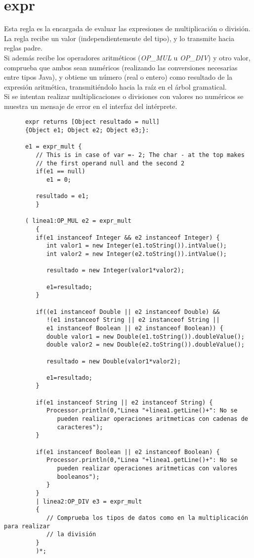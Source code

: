    \section{expr}
   Esta regla es la encargada de evaluar las expresiones de multiplicación o división. La regla recibe un valor 
   (independientemente del tipo), y lo transmite hacia reglas padre. \\
   Si además recibe los operadores aritméticos (\textit{OP\_MUL} u \textit{OP\_DIV}) y otro valor, comprueba que ambos sean 
   numéricos (realizando las conversiones necesarias entre tipos Java), y obtiene un número (real o entero) como resultado de la
   expresión aritmética, transmitiéndolo hacia la raíz en el árbol gramatical.\\
   
   Si se intentan realizar multiplicaciones o divisiones con valores no numéricos se muestra un mensaje de error en el 
   interfaz del intérprete.
   \begin{lstlisting}
      expr returns [Object resultado = null]
      {Object e1; Object e2; Object e3;}: 
      
      e1 = expr_mult {
         // This is in case of var =- 2; The char - at the top makes 
         // the first operand null and the second 2
         if(e1 == null)
            e1 = 0;
            
         resultado = e1;
         }

      ( linea1:OP_MUL e2 = expr_mult
         {            
         if(e1 instanceof Integer && e2 instanceof Integer) {
            int valor1 = new Integer(e1.toString()).intValue();
            int valor2 = new Integer(e2.toString()).intValue();
            
            resultado = new Integer(valor1*valor2);
            
            e1=resultado;
         }
            
         if((e1 instanceof Double || e2 instanceof Double) && 
            !(e1 instanceof String || e2 instanceof String || 
            e1 instanceof Boolean || e2 instanceof Boolean)) {
            double valor1 = new Double(e1.toString()).doubleValue();
            double valor2 = new Double(e2.toString()).doubleValue();
            
            resultado = new Double(valor1*valor2);
            
            e1=resultado;
         }
            
         if(e1 instanceof String || e2 instanceof String) {
            Processor.println(0,"Linea "+linea1.getLine()+": No se
               pueden realizar operaciones aritmeticas con cadenas de
               caracteres");
         }
            
         if(e1 instanceof Boolean || e2 instanceof Boolean) {
            Processor.println(0,"Linea "+linea1.getLine()+": No se
               pueden realizar operaciones aritmeticas con valores
               booleanos");
            }
         }
         | linea2:OP_DIV e3 = expr_mult
         {
            // Comprueba los tipos de datos como en la multiplicación para realizar 
            // la división 
         }
         )*;
   \end{lstlisting}

